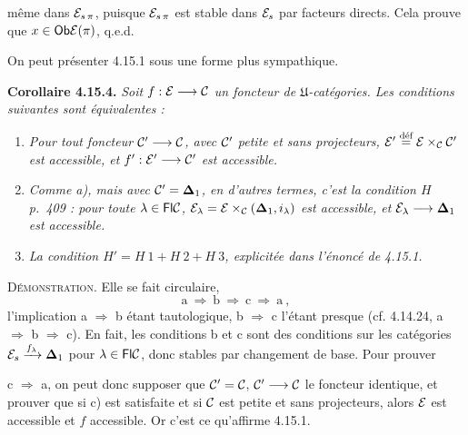 même dans $\mathcal{E}_{s\,\pi}$, puisque $\mathcal{E}_{s\,\pi}$ est stable dans $\mathcal{E}_s$ par facteurs directs. Cela prouve que $x \in \mathsf{Ob} \mathcal{E}(\pi)$, q.e.d.

On peut présenter 4.15.1 sous une forme plus sympathique.

\textbf{Corollaire 4.15.4.} \textit{Soit $f : \mathcal{E} \longrightarrow \mathcal{C}$ un foncteur de $\mathfrak{U}$-catégories. Les conditions suivantes sont équivalentes :}
\begin{enumerate}
\item[\textit{a)}] \textit{Pour tout foncteur $\mathcal{C}' \longrightarrow \mathcal{C}$, avec $\mathcal{C}'$ petite et sans projecteurs, $\mathcal{E}' \overset{\text{déf}}{=} \mathcal{E} \times_{\mathcal{C}} \mathcal{C}'$ est accessible, et $f' : \mathcal{E}' \longrightarrow \mathcal{C}'$ est accessible.}
\item[\textit{b)}] \textit{Comme a), mais avec $\mathcal{C}' = \mathbf{\Delta}_1$, en d'autres termes, c'est la condition $H$ p.~409 : pour toute $\lambda \in \mathsf{Fl} \mathcal{C}$, $\mathcal{E}_{\lambda} = \mathcal{E} \times_{\mathcal{C}} (\mathbf{\Delta}_1, i_{\lambda})$ est accessible, et $\mathcal{E}_{\lambda} \longrightarrow \mathbf{\Delta}_1$ est accessible.}
\item[\textit{c)}] \textit{La condition $H' = H\ \mathit{1} + H\ \mathit{2} + H\ \mathit{3}$, explicitée dans l'énoncé de 4.15.1.}
\end{enumerate}
\textsc{Démonstration}. Elle se fait circulaire,
\[
\mathrm{a} \ \Longrightarrow \ \mathrm{b} \ \Longrightarrow \ \mathrm{c} \ \Longrightarrow \ \mathrm{a} \ ,
\]
l'implication a $\Longrightarrow$ b étant tautologique, b $\Longrightarrow$ c l'étant presque (cf. 4.14.24, a $\Longrightarrow$ b $\Longrightarrow$ c). En fait, les conditions b et c sont des conditions sur les catégories $\mathcal{E}_s \xrightarrow{f_{\lambda}} \mathbf{\Delta}_1$ pour $\lambda \in \mathsf{Fl} \mathcal{C}$, donc stables par changement de base. Pour prouver

c $\Longrightarrow$ a, on peut donc supposer que $\mathcal{C}' = \mathcal{C}$, $\mathcal{C}' \longrightarrow \mathcal{C}$ le foncteur identique, et prouver que si c) est satisfaite et si $\mathcal{C}$ est petite et sans projecteurs, alors $\mathcal{E}$ est accessible et $f$ accessible. Or c'est ce qu'affirme 4.15.1.

